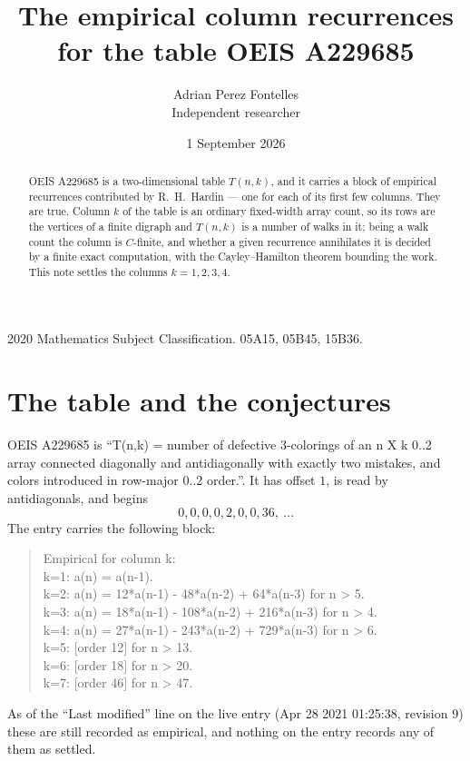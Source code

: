 \documentclass[11pt,a4paper]{article}
\title{The empirical column recurrences for the table OEIS A229685}
\author{Adrian Perez Fontelles\\ \small Independent researcher}
\date{1 September 2026}
\theoremstyle{plain}
\theoremstyle{definition}
\begin{document}
\maketitle

\begin{abstract}
OEIS A229685 is a two-dimensional table $T(n,k)$, and it carries a block of empirical
recurrences contributed by R.~H.~Hardin --- one for each of its first few columns. They are
true. Column $k$ of the table is an ordinary fixed-width array count, so its rows are the
vertices of a finite digraph and $T(n,k)$ is a number of walks in it; being a walk count the
column is $C$-finite, and whether a given recurrence annihilates it is decided by a finite
exact computation, with the Cayley--Hamilton theorem bounding the work. This note settles the columns $k=1, 2, 3, 4$.
\end{abstract}

\noindent\small 2020 Mathematics Subject Classification. 05A15, 05B45, 15B36.\normalsize

\section{The table and the conjectures}

OEIS A229685 is ``T(n,k) = number of defective 3-colorings of an n X k 0..2 array connected diagonally and antidiagonally with exactly two mistakes, and colors introduced in row-major 0..2 order.''. It has offset $1$, is
read by antidiagonals, and begins
\[
0, 0, 0, 0, 2, 0, 0, 36,\ \dots
\]
The entry carries the following block:
\begin{quote}\small
Empirical for column k:\\
k=1: a(n) = a(n-1).\\
k=2: a(n) = 12*a(n-1) - 48*a(n-2) + 64*a(n-3) for n > 5.\\
k=3: a(n) = 18*a(n-1) - 108*a(n-2) + 216*a(n-3) for n > 4.\\
k=4: a(n) = 27*a(n-1) - 243*a(n-2) + 729*a(n-3) for n > 6.\\
k=5: [order 12] for n > 13.\\
k=6: [order 18] for n > 20.\\
k=7: [order 46] for n > 47.\\
\end{quote}
As of the ``Last modified'' line on the live entry (Apr 28 2021 01:25:38, revision 9) these are still
recorded as empirical, and nothing on the entry records any of them as settled.
\end{document}
